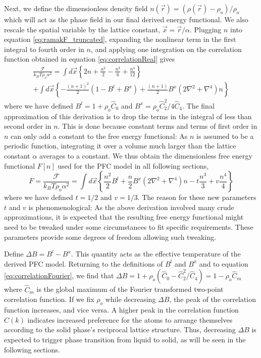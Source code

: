 Next, we define the dimensionless density field $n(\vec{r})=(\rho(\vec{r})-\rho_o)/\rho_o$ which will act as the phase field in our final derived energy functional. We also rescale the spatial variable by the lattice constant, $\vec{x} = \vec{r}/\alpha$. Plugging $n$ into equation \ref{eq:ramakF_truncated}, expanding the nonlinear term in the first integral to fourth order in $n$, and applying one integration on the correlation function obtained in equation \ref{eq:correlationReal} gives
\begin{multline}\label{eq:derivedFunctional}
\frac{\mathcal{F}}{k_B T \rho_o \alpha^2}= \int d\vec{x}  \left\{2n + \frac{n^2}{2} - \frac{n^3}{6}+\frac{n^4}{12}\right\} \\ +\int d\vec{x}\left\{  -\frac{(n+1)^2}{2}(1-B^l+B^x)+ \frac{(n+1)}{2}B^x(2\nabla^2+\nabla^4)n \right\}
\end{multline}
where we have defined $B^l=1+\rho_o \hat{C}_0$ and $B^x=\rho_o \hat{C}_2^2/4\hat{C}_4$. The final approximation of this derivation is to drop the terms in the integral of less than second order in $n$. This is done because constant terms and terms of first order in $n$ can only add a constant to the free energy functional: As $n$ is assumed to be a periodic function, integrating it over a volume much larger than the lattice constant $\alpha$ averages to a constant. We thus obtain the dimensionless free energy functional $F[n]$ used for the PFC model in all following sections,
\begin{equation}\label{eq:PFC_energyFunctional}
F=\frac{\mathcal{F}}{k_B T \rho_o \alpha^2}= \int d\vec{x} \left\{ \frac{n^2}{2}B^l +\frac{n}{2}B^x(2\nabla^2+\nabla^4)n -t \frac{n^3}{3} + v \frac{n^4}{4}\right\}
\end{equation}
where we have defined $t=1/2$ and $v=1/3$. The reason for these new parameters $t$ and $v$ is phenomenological: As the above derivation involved many crude approximations, it is expected that the resulting free energy functional might need to be tweaked under some circumstances to fit specific requirements. These parameters provide some degrees of freedom allowing such tweaking.

Define $\Delta B = B^l - B^x$. This quantity acts as the effective temperature of the derived PFC model. Returning to the definitions of $B^l$ and $B^x$ and to equation \ref{eq:correlationFourier}, we find that $\Delta B = 1 + \rho_o (\hat{C}_0-\hat{C}_2^2/\hat{C}_4)=1-\rho_o \hat{C}_m$ where $\hat{C}_m$ is the global maximum of the Fourier transformed two-point correlation function. If we fix $\rho_o$ while decreasing $\Delta B$, the peak of the correlation function increases, and vice versa. A higher peak in the correlation function $\hat{C}(k)$ indicates increased preference for the atoms to arrange themselves according to the solid phase's reciprocal lattice structure. Thus, decreasing $\Delta B$ is expected to trigger phase transition from liquid to solid, as will be seen in the following sections.




